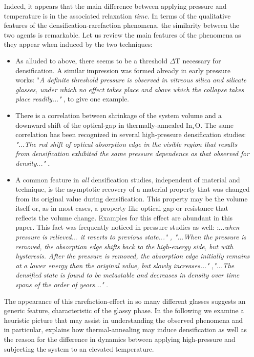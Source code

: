 \documentclass
[preprint,showpacs,byrevtex,10pt,twocolumn,tightenlines,prl,letterpaper]{revtex4}%
\begin{document}
Indeed, it appears that the main difference between applying pressure and
temperature is in the associated relaxation \textit{time. }In terms of the
qualitative features of the densification-rarefaction phenomena, the
similarity between the two agents is remarkable. Let us review the main
features of the phenomena as they appear when induced by the two techniques:

\begin{itemize}
\item As alluded to above, there seems to be a threshold $\Delta$T necessary
for densification. A similar impression was formed already in early pressure
works: "\textit{A definite threshold pressure is observed in vitreous silica
and silicate glasses, under which no effect takes place and above which the
collapse takes place readily...}\emph{" }\cite{1}, to give one example.

\item There is a correlation between shrinkage of the system volume and a
downward shift of the optical-gap in thermally-annealed In$_{\text{x}}$O. The
same correlation has been recognized in several high-pressure densification
studies: \textit{"...The red shift of optical absorption edge in the visible
region that results from densification exhibited the same pressure dependence
as that observed for density..." }\cite{12}.

\item A common feature in \textit{all} densification studies, independent of
material and technique, is the asymptotic recovery of a material property that
was changed from its original value during densification. This property may be
the volume itself or, as in most cases, a property like optical-gap or
resistance that reflects the volume change. Examples for this effect are
abundant in this paper. This fact was frequently noticed in pressure studies
as well: :...\textit{when pressure is relieved... it reverts to previous
state..." \cite{6}, "...When the pressure is removed, the absorption edge
shifts back to the high-energy side, but with hysteresis. After the pressure
is removed, the absorption edge initially remains at a lower energy than the
original value, but slowly increases..." }\cite{7}\textit{,"...The densified
state is found to be metastable and decreases in density over time spans of
the order of years..."} \cite{8}.
\end{itemize}

The appearance of this rarefaction-effect in so many different glasses
suggests an generic feature, characteristic of the glassy phase. In the
following we examine a heuristic picture that may assist in understanding the
observed phenomena and in particular, explains how thermal-annealing may
induce densification as well as the reason for the difference in dynamics
between applying high-pressure and subjecting the system to an elevated temperature.
\end{document}
